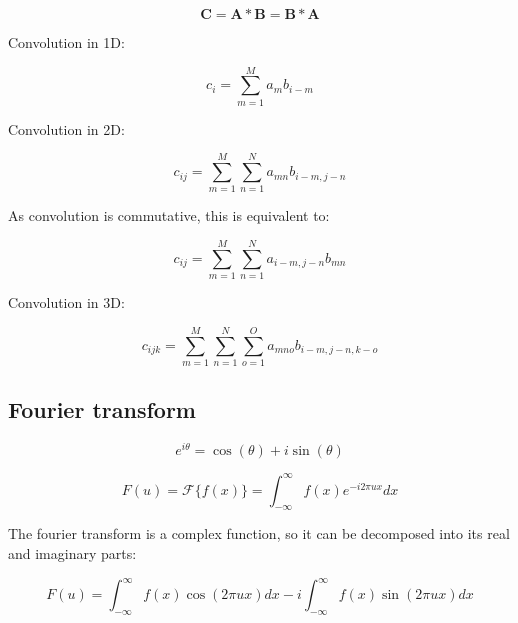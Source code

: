 \begin{equation}\label{eq:convolution}
    \bm{C} = \bm{A} * \bm{B} = \bm{B} * \bm{A}
\end{equation}

Convolution in 1D:

\begin{equation}\label{eq:convolution-elements-1d}
    c_i = \sum_{m=1}^{M} a_m b_{i - m}
\end{equation}

Convolution in 2D:

\begin{equation}\label{eq:convolution-elements-2d-1}
    c_{i j} = \sum_{m=1}^{M} \sum_{n=1}^{N} a_{m n} b_{i - m, j - n}
\end{equation}

As convolution is commutative, this is equivalent to:

\begin{equation}\label{eq:convolution-elements-2d-2}
    c_{i j} = \sum_{m=1}^{M} \sum_{n=1}^{N} a_{i - m, j - n} b_{m n}
\end{equation}

Convolution in 3D:

\begin{equation}\label{eq:convolution-elements-3d}
    c_{i j k} = \sum_{m=1}^{M} \sum_{n=1}^{N} \sum_{o=1}^{O} a_{m n o} b_{i - m, j - n, k - o}
\end{equation}


\subsection{Fourier transform}\label{subsec:fourier-transform}

\begin{equation}\label{eq:exp-operations}
    e^{i \theta} = \cos (\theta) + i \sin (\theta)
\end{equation}

\begin{equation}\label{eq:fourier-transform-operations}
    F (u) = \mathcal{F}\{f (x)\} = \int^{\infty}_{-\infty} f (x) e^{-i 2 \pi u x} d x
\end{equation}

The fourier transform is a complex function, so it can be decomposed into its real and imaginary parts:

\begin{equation}\label{eq:fourier-transform-decomposition-operations}
    F (u) = \int^{\infty}_{-\infty} f (x) \cos (2 \pi u x) d x
        - i \int^{\infty}_{-\infty} f (x) \sin (2 \pi u x) d x
\end{equation}

